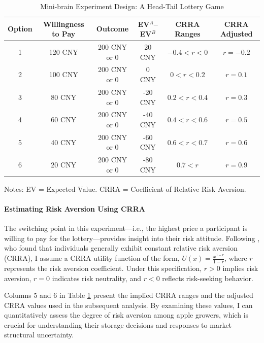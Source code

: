 \documentclass[12pt]{article}
\begin{document}
\begin{table}[H]
    \centering
    \footnotesize 
    \caption{Mini-brain Experiment Design: A Head-Tail Lottery Game}
    \renewcommand{\arraystretch}{1.2}
    \begin{tabular}{cccccc}
        \toprule
        \textbf{Option} & \textbf{Willingness to Pay} & \textbf{Outcome} & \textbf{EV$^{A}$--EV$^{B}$} & \textbf{CRRA Ranges} & \textbf{CRRA Adjusted}\\
        \midrule
        1 & 120 CNY & 200 CNY or 0 & 20 CNY & $-0.4 < r < 0$  & $r = -0.2$\\
        2 & 100 CNY & 200 CNY or 0 & 0 CNY & $0 < r < 0.2$  & $r= 0.1$ \\
        3 & 80 CNY & 200 CNY or 0 & -20 CNY & $0.2 < r < 0.4$  & $r= 0.3$ \\
        4 & 60 CNY & 200 CNY or 0 & -40 CNY & $0.4 < r < 0.6$  & $r= 0.5$ \\
        5 & 40 CNY & 200 CNY or 0 & -60 CNY & $0.6 < r < 0.7$  & $r=0.6$ \\
        6 & 20 CNY & 200 CNY or 0 & -80 CNY & $0.7 < r$  & $r= 0.9$ \\
        \bottomrule
    \end{tabular}
    \label{tab:experiment_design}
    \vspace{0.5em}
    \small Notes: EV = Expected Value. CRRA = Coefficient of Relative Risk Aversion.
\end{table}

\paragraph{Estimating Risk Aversion Using CRRA}
The switching point in this experiment—i.e., the highest price a participant is willing to pay for the lottery—provides insight into their risk attitude. Following \cite{chiappori2011relative}, who found that individuals generally exhibit constant relative risk aversion (CRRA), I assume a CRRA utility function of the form, $U(x) = \frac{x^{1-r}}{1 - r}$, where \(r\) represents the risk aversion coefficient. Under this specification, \(r > 0\) implies risk aversion, \(r = 0\) indicates risk neutrality, and \(r < 0\) reflects risk-seeking behavior.

Columns 5 and 6 in Table \ref{tab:experiment_design} present the implied CRRA ranges and the adjusted CRRA values used in the subsequent analysis. By examining these values, I can quantitatively assess the degree of risk aversion among apple growers, which is crucial for understanding their storage decisions and responses to market structural uncertainty.
\end{document}
